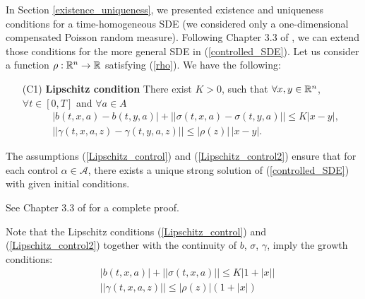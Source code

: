 In Section \ref{existence_uniqueness}, we presented existence and uniqueness conditions for a time-homogeneous SDE 
(we considered only a one-dimensional compensated
Poisson random measure). 
Following Chapter 3.3 of \cite{Skorohod}, we can extend 
those conditions for the more general SDE in (\ref{controlled_SDE}).
Let us consider a function $\rho : \mathbb{R}^n \to \mathbb{R} $ satisfying (\ref{rho}).
We have the following:
\begin{itemize}
 \item[(C1)] \textbf{Lipschitz condition} There exist $K >0$, such that $\forall x,y \in \mathbb{R}^n$, $\forall t \in [0,T]$ and $\forall a \in A$
 \begin{align}\label{Lipschitz_control}
  &|b(t,x,a) - b(t,y,a)| + || \sigma(t,x,a) - \sigma(t,y,a) || \leq K |x-y|,\\  
  & ||\gamma(t,x,a,z) - \gamma(t,y,a,z)|| \leq |\rho(z)|\,|x-y|. \label{Lipschitz_control2}
 \end{align}
\end{itemize}
\begin{Theorem}
 The assumptions (\ref{Lipschitz_control}) and (\ref{Lipschitz_control2}) 
 ensure that for each control $\alpha \in \mathcal{A}$, there exists a unique strong solution of (\ref{controlled_SDE}) with given initial 
 conditions.
\end{Theorem}
See Chapter 3.3 of \cite{Skorohod} for a complete proof.

Note that the Lipschitz conditions (\ref{Lipschitz_control}) and (\ref{Lipschitz_control2}) together with the continuity of $b$, $\sigma$, $\gamma$, imply the growth conditions:
\begin{align}
 & |b(t,x,a)| + ||\sigma(t,x,a)||  \leq K |1+|x|| \\  
 & || \gamma(t,x,a,z) || \leq |\rho(z)| (1+|x|) \label{Growth_control2}
\end{align}


